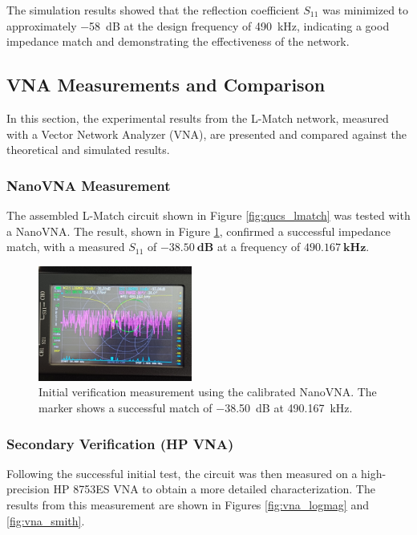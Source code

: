 The simulation results showed that the reflection coefficient \( S_{11} \) was minimized to approximately \SI{-58}{\deci\bel} at the design frequency of \SI{490}{\kilo\hertz}, indicating a good impedance match and demonstrating the effectiveness of the network.

\subsection{VNA Measurements and Comparison}
\label{sec:vna}

In this section, the experimental results from the L-Match network, measured with a Vector Network Analyzer (VNA), are presented and compared against the theoretical and simulated results.

\subsubsection{NanoVNA Measurement}

The assembled L-Match circuit shown in Figure \ref{fig:qucs_lmatch} was tested with a NanoVNA. The result, shown in Figure \ref{fig:nanovna}, confirmed a successful impedance match, with a measured $S_{11}$ of $\mathbf{\SI{-38.50}{\deci\bel}}$ at a frequency of $\mathbf{\SI{490.167}{\kilo\hertz}}$.

\begin{figure}[H]
    \centering
    \includegraphics[width=0.45\textwidth]{Images/nanovna_s11.jpeg}
    \caption{Initial verification measurement using the calibrated NanoVNA. The marker shows a successful match of \SI{-38.50}{\deci\bel} at \SI{490.167}{\kilo\hertz}.}
    \label{fig:nanovna}
\end{figure}

\subsubsection{Secondary Verification (HP VNA)}
Following the successful initial test, the circuit was then measured on a high-precision HP 8753ES VNA to obtain a more detailed characterization. The results from this measurement are shown in Figures \ref{fig:vna_logmag} and \ref{fig:vna_smith}.

